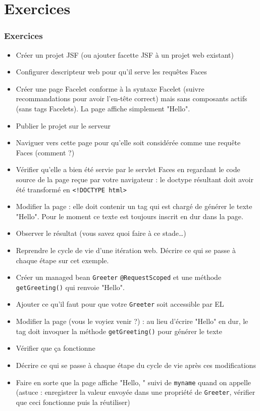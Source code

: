 \documentclass[english, french]{beamer}
\begin{document}
\section{Exercices}
\begin{frame}[allowframebreaks]
	\frametitle{Exercices}
	\begin{itemize}
		\item Créer un projet JSF (ou ajouter facette JSF à un projet web existant)
		\item Configurer descripteur web pour qu’il serve les requêtes Faces
		\item Créer une page Facelet  conforme à la syntaxe Facelet (suivre recommandations pour avoir l’en-tête correct) mais sans composants actifs (sans tags Facelets). La page affiche simplement "Hello".
		\item Publier le projet sur le serveur
		\item Naviguer vers cette page pour qu’elle soit considérée comme une requête Faces (comment ?)
		\item Vérifier qu’elle a bien été servie par le servlet Faces en regardant le code source de la page reçue par votre navigateur : le doctype résultant doit avoir été transformé en \texttt{<!DOCTYPE html>}
		\item Modifier la page  : elle doit contenir un tag  qui est chargé de générer le texte "Hello". Pour le moment ce texte est toujours inscrit en dur dans la page.
		\item Observer le résultat (vous savez quoi faire à ce stade…)
		\item Reprendre le cycle de vie d’une itération web. Décrire ce qui se passe à chaque étape sur cet exemple.
		\item Créer un managed bean \texttt{Greeter} \texttt{@RequestScoped} et une méthode \texttt{getGreeting()} qui renvoie "Hello".
		\item Ajouter ce qu’il faut pour que votre \texttt{Greeter} soit accessible par EL
		\item Modifier la page (vous le voyiez venir ?) : au lieu d’écrire "Hello" en dur, le tag doit invoquer la méthode \texttt{getGreeting()} pour générer le texte
		\item Vérifier que ça fonctionne
		\item Décrire ce qui se passe à chaque étape du cycle de vie après ces modifications
		\item Faire en sorte que la page affiche "Hello, " suivi de \texttt{myname} quand on appelle  {\tiny (astuce : enregistrer la valeur envoyée dans une propriété de \texttt{Greeter}, vérifier que ceci fonctionne puis la réutiliser)}

\end{itemize}
\end{frame}
\end{document}
